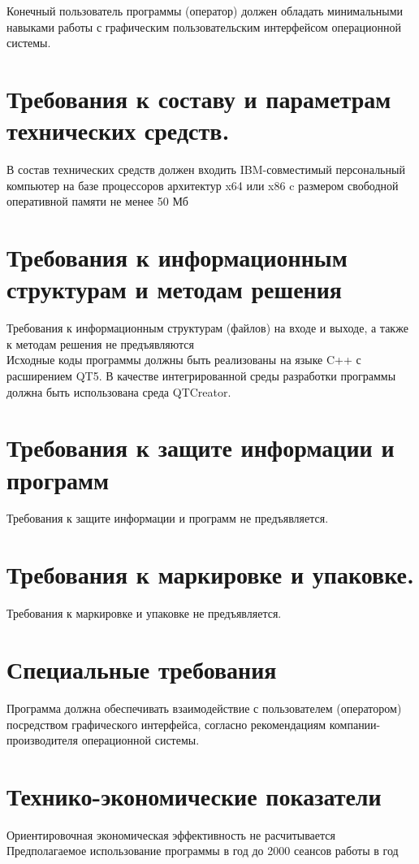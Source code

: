 Конечный пользователь программы (оператор) должен обладать минимальными навыками работы с графическим пользовательским интерфейсом операционной системы.\\
\section{Требования к составу и параметрам технических средств.}
В состав технических средств должен входить IBM-совместимый персональный компьютер на базе процессоров архитектур x64 или x86 c размером свободной оперативной памяти не менее 50 Мб\\
\section{Требования к информационным структурам и методам решения}
Требования к информационным структурам (файлов) на входе и выходе, а также к методам решения не предъявляются\\

Исходные коды программы должны быть реализованы на языке C++ с расширением QT5. В качестве интегрированной среды разработки программы должна быть использована среда QTCreator.\\
\section{Требования к защите информации и программ}
Требования к защите информации и программ не предъявляется.\\
\section{Требования к маркировке и упаковке.}
Требования к маркировке и упаковке не предъявляется.\\
\section{Специальные требования}
Программа должна обеспечивать взаимодействие с пользователем (оператором) посредством графического интерфейса, согласно рекомендациям компании-производителя операционной системы.\\
\section{Технико-экономические показатели}
Ориентировочная экономическая эффективность не расчитывается\\
Предполагаемое использование программы в год до 2000 сеансов работы в год\\


